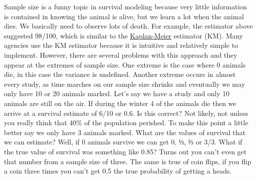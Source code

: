 \documentclass[
]{book}
\begin{document}
Sample size is a funny topic in survival modeling because very little information is contained in knowing the animal is alive, but we learn a lot when the animal dies. We basically need to observe lots of death. For example, the estimator above suggested 98/100, which is similar to the \href{https://en.wikipedia.org/wiki/Kaplan\%E2\%80\%93Meier_estimator\#:~:text=The\%20Kaplan\%E2\%80\%93Meier\%20estimator\%2C\%20also,amount\%20of\%20time\%20after\%20treatment.}{Kaplan-Meier} estimator (KM). Many agencies use the KM estimator because it is intuitive and relatively simple to implement. However, there are several problems with this approach and they appear at the extremes of sample size. One extreme is the case where 0 animals die, in this case the variance is undefined. Another extreme occurs in almost every study, as time marches on our sample size shrinks and eventually we may only have 10 or 20 animals marked. Let's say we have a study and only 10 animals are still on the air. If during the winter 4 of the animals die then we arrive at a survival estimate of 6/10 or 0.6. Is this correct? Not likely, not unless you really think that 40\% of the population perished. To make this point a little better say we only have 3 animals marked. What are the values of survival that we can estimate? Well, if 0 animals survive we can get 0, ⅓, ⅔ or 3/3. What if the true value of survival was something like 0.85? Turns out you can't even get that number from a sample size of three. The same is true of coin flips, if you flip a coin three times you can't get 0.5 the true probability of getting a heads.
\end{document}
